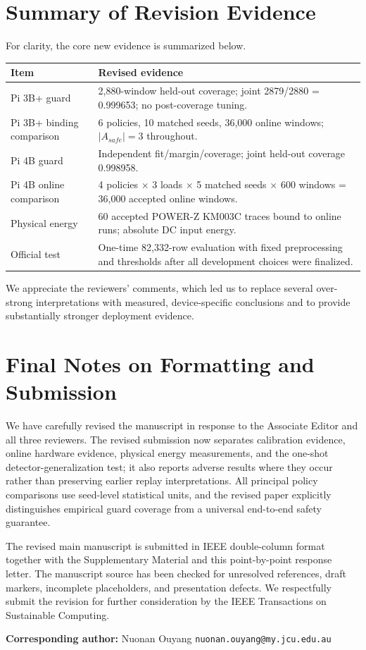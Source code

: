 \documentclass[11pt,a4paper]{article}
\begin{document}
\section*{Summary of Revision Evidence}
For clarity, the core new evidence is summarized below.
\begin{center}\footnotesize
\begin{tabularx}{\textwidth}{lX}
\toprule
Item & Revised evidence \\
\midrule
Pi 3B+ guard & 2,880-window held-out coverage; joint 2879/2880 = 0.999653; no post-coverage tuning. \\
Pi 3B+ binding comparison & 6 policies, 10 matched seeds, 36,000 online windows; $|A_{safe}|=3$ throughout. \\
Pi 4B guard & Independent fit/margin/coverage; joint held-out coverage 0.998958. \\
Pi 4B online comparison & 4 policies $\times$ 3 loads $\times$ 5 matched seeds $\times$ 600 windows = 36,000 accepted online windows. \\
Physical energy & 60 accepted POWER-Z KM003C traces bound to online runs; absolute DC input energy. \\
Official test & One-time 82,332-row evaluation with fixed preprocessing and thresholds after all development choices were finalized. \\
\bottomrule
\end{tabularx}
\end{center}

We appreciate the reviewers' comments, which led us to replace several over-strong interpretations with measured, device-specific conclusions and to provide substantially stronger deployment evidence.


\section*{Final Notes on Formatting and Submission}
\begin{authorresponsebox}
We have carefully revised the manuscript in response to the Associate Editor and all three reviewers. The revised submission now separates calibration evidence, online hardware evidence, physical energy measurements, and the one-shot detector-generalization test; it also reports adverse results where they occur rather than preserving earlier replay interpretations. All principal policy comparisons use seed-level statistical units, and the revised paper explicitly distinguishes empirical guard coverage from a universal end-to-end safety guarantee.

The revised main manuscript is submitted in IEEE double-column format together with the Supplementary Material and this point-by-point response letter. The manuscript source has been checked for unresolved references, draft markers, incomplete placeholders, and presentation defects. We respectfully submit the revision for further consideration by the IEEE Transactions on Sustainable Computing.
\end{authorresponsebox}
\vspace{6pt}
\noindent\textbf{Corresponding author:} Nuonan Ouyang \quad \texttt{nuonan.ouyang@my.jcu.edu.au}
\end{document}
